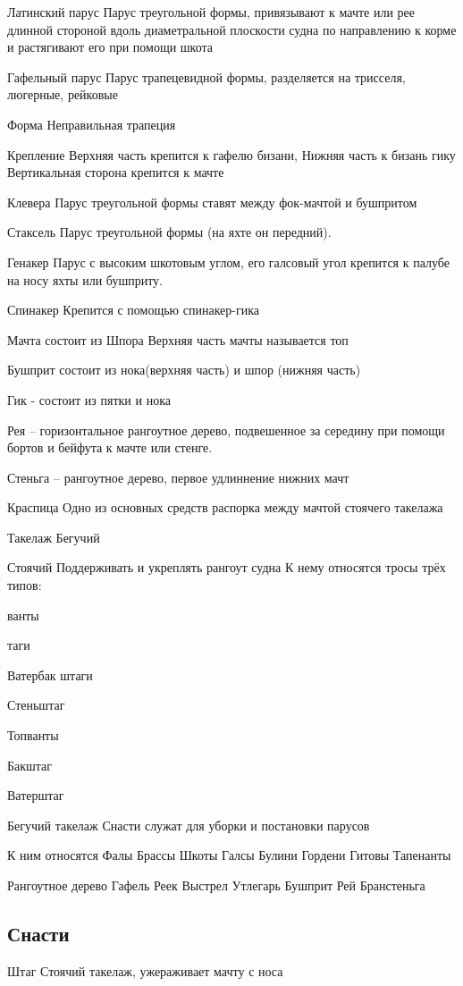 \documentclass{article}        %
\begin{document}
Латинский парус
Парус треугольной формы, привязывают к мачте или рее длинной стороной вдоль диаметральной плоскости судна по направлению к корме и растягивают его при помощи шкота

Гафельный парус
Парус трапецевидной формы, разделяется на трисселя, люгерные, рейковые

Форма
Неправильная трапеция

Крепление
Верхняя часть крепится к гафелю бизани, 
Нижняя часть к бизань гику
Вертикальная сторона крепится к мачте

Клевера
Парус треугольной формы ставят между фок-мачтой и бушпритом


Стаксель
Парус треугольной формы (на яхте он передний).

Генакер
Парус с высоким шкотовым углом, его галсовый угол крепится к палубе на носу яхты или бушприту.

Спинакер
Крепится с помощью спинакер-гика

Мачта состоит из 
Шпора
Верхняя часть мачты называется топ

Бушприт состоит из нока(верхняя часть) и шпор (нижняя часть)

Гик - состоит из пятки и нока


Рея -- горизонтальное рангоутное дерево, подвешенное за середину при помощи бортов и бейфута к мачте или стенге.

Стеньга -- рангоутное дерево, первое удлиннение нижних мачт

Краспица
Одно из основных средств распорка между мачтой стоячего такелажа



Такелаж
Бегучий

Стоячий
Поддерживать и укреплять рангоут судна
К нему относятся тросы трёх типов:
\item ванты
\item таги
\item Ватербак штаги
\item Стеньштаг
\item Топванты
\item Бакштаг
\item Ватерштаг

Бегучий такелаж
Снасти служат для уборки и постановки парусов

К ним относятся
Фалы
Брассы
Шкоты
Галсы
Булини
Гордени
Гитовы
Тапенанты


Рангоутное дерево
Гафель
Реек
Выстрел
Утлегарь
Бушприт
Рей
Бранстеньга


\subsection{Снасти}
Штаг
Стоячий такелаж, ужераживает мачту с носа
\end{document}
